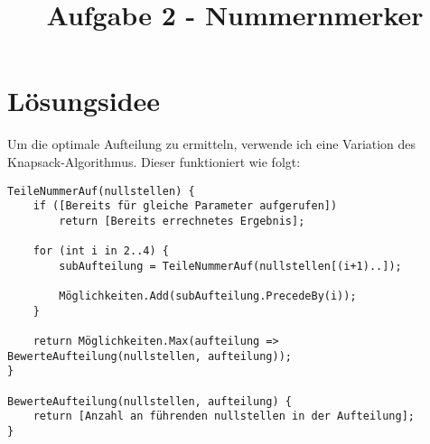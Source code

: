 \documentclass[12pt]{article}
\begin{document}
\title{Aufgabe 2 - Nummernmerker}

\section{Lösungsidee}

Um die optimale Aufteilung zu ermitteln, verwende ich eine Variation des Knapsack-Algorithmus. Dieser funktioniert wie folgt:

\begin{lstlisting}
TeileNummerAuf(nullstellen) {
    if ([Bereits für gleiche Parameter aufgerufen])
        return [Bereits errechnetes Ergebnis];

    for (int i in 2..4) {
        subAufteilung = TeileNummerAuf(nullstellen[(i+1)..]);

        Möglichkeiten.Add(subAufteilung.PrecedeBy(i));
    }

    return Möglichkeiten.Max(aufteilung => BewerteAufteilung(nullstellen, aufteilung));
}

BewerteAufteilung(nullstellen, aufteilung) {
    return [Anzahl an führenden nullstellen in der Aufteilung];
}
\end{lstlisting}
\end{document}
